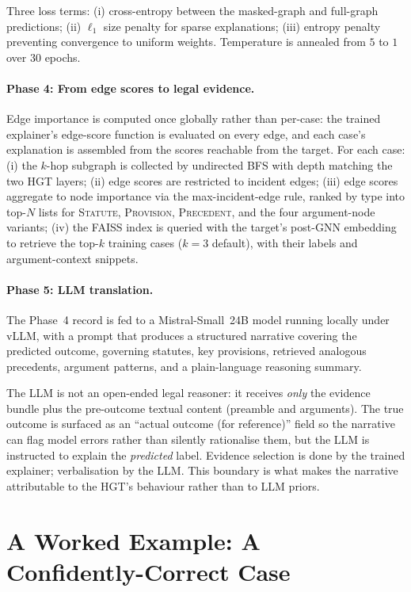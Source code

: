Three loss terms: (i) cross-entropy between the masked-graph and full-graph predictions; (ii) $\ell_1$ size penalty for sparse explanations; (iii) entropy penalty preventing convergence to uniform weights. Temperature is annealed from $5$ to $1$ over 30 epochs.

\paragraph{Phase 4: From edge scores to legal evidence.} Edge importance is computed once globally rather than per-case: the trained explainer's edge-score function is evaluated on every edge, and each case's explanation is assembled from the scores reachable from the target. For each case: (i) the $k$-hop subgraph is collected by undirected BFS with depth matching the two HGT layers; (ii) edge scores are restricted to incident edges; (iii) edge scores aggregate to node importance via the max-incident-edge rule, ranked by type into top-$N$ lists for \textsc{Statute}, \textsc{Provision}, \textsc{Precedent}, and the four argument-node variants; (iv) the FAISS index is queried with the target's post-GNN embedding to retrieve the top-$k$ training cases ($k=3$ default), with their labels and argument-context snippets.

\paragraph{Phase 5: LLM translation.} The Phase~4 record is fed to a Mistral-Small~24B model running locally under vLLM, with a prompt that produces a structured narrative covering the predicted outcome, governing statutes, key provisions, retrieved analogous precedents, argument patterns, and a plain-language reasoning summary.

The LLM is not an open-ended legal reasoner: it receives \emph{only} the evidence bundle plus the pre-outcome textual content (preamble and arguments). The true outcome is surfaced as an ``actual outcome (for reference)'' field so the narrative can flag model errors rather than silently rationalise them, but the LLM is instructed to explain the \emph{predicted} label. Evidence selection is done by the trained explainer; verbalisation by the LLM. This boundary is what makes the narrative attributable to the HGT's behaviour rather than to LLM priors.

\section{A Worked Example: A Confidently-Correct Case}
\label{sec:worked_correct}

